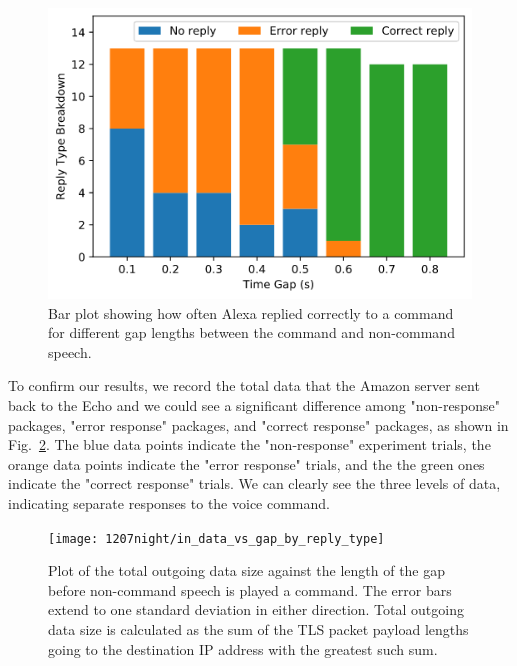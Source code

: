 \begin{figure}[ht]
	\centering
	\includegraphics[scale=0.4]{../measurement/results/1207night/reply_type_breakdown}
	\caption{Bar plot showing how often Alexa replied correctly to a command for different gap lengths between the command and non-command speech.}
	\label{fig:gap}
	\vspace{-3mm}
	\end{figure}

To confirm our results, we record the total data that the Amazon server sent back to the Echo and we could see a significant difference among "non-response" packages, "error response" packages, and "correct response" packages, as shown in Fig.~\ref{fig:postfix_variablegap_sizes}. The blue data points indicate the "non-response" experiment trials, the orange data points indicate the "error response" trials, and the the green ones indicate the "correct response" trials. We can clearly see the three levels of data, indicating separate responses to the voice command.

\begin{figure}[]
    \centering
    \texttt{[image: 1207night/in\_data\_vs\_gap\_by\_reply\_type]}
    \caption{Plot of the total outgoing data size against the length of the gap before non-command speech is played a command. The error bars extend to one standard deviation in either direction. Total outgoing data size is calculated as the sum of the TLS packet payload lengths going to the destination IP address with the greatest such sum.}
    \label{fig:postfix_variablegap_sizes}
\end{figure}






